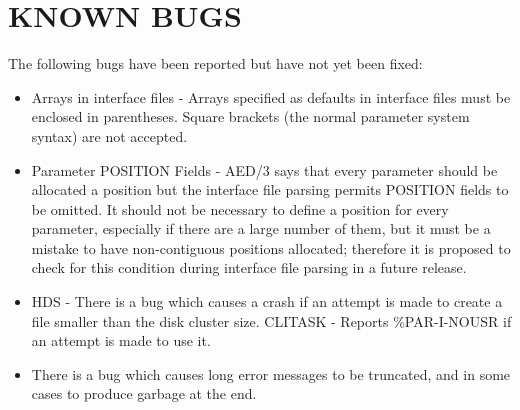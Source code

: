\section{KNOWN BUGS}
\label{bugs}
The following bugs have been reported but have not yet been fixed:
\begin{itemize}
\item Arrays in interface files - Arrays specified as defaults in interface 
files must be enclosed in parentheses.
Square brackets (the normal parameter system syntax) are not accepted.
\item Parameter POSITION Fields - AED/3 says that every parameter should be 
allocated a position but the interface file parsing permits POSITION fields to 
be omitted.  
It should not be necessary to define a position for every parameter, especially
if there are a large number of them, but it must be a mistake to have
non-contiguous positions allocated; therefore it is proposed to check for this
condition during interface file parsing in a future release.
\item HDS - There is a bug which causes a crash if an attempt is made to 
create a file smaller than the disk cluster size.
CLITASK - Reports \%PAR-I-NOUSR if an attempt is made to use it.
\item There is a bug which causes long error messages to be truncated, and in
some cases to produce garbage at the end.
\end{itemize}

